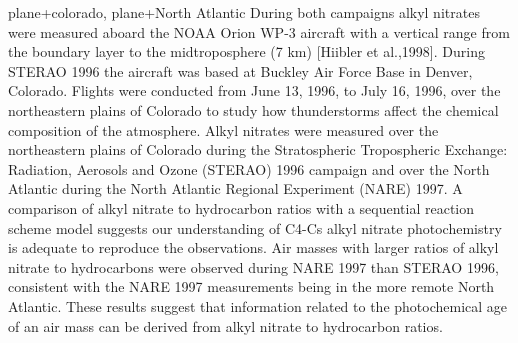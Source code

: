 \documentclass[11pt,a4paper]{article}
\begin{document}
\citep{Stroud2001} plane+colorado, plane+North Atlantic
During both campaigns alkyl nitrates were measured aboard the NOAA Orion WP-3 aircraft with a vertical range from the boundary layer to the midtroposphere (7 km) [Hiibler et al.,1998]. During STERAO 1996 the aircraft was based at Buckley Air Force Base in Denver, Colorado. Flights were conducted from June 13, 1996, to July 16, 1996, over the northeastern plains of Colorado to study how thunderstorms affect the chemical composition of the atmosphere.
Alkyl nitrates were measured over the northeastern plains of Colorado during the Stratospheric Tropospheric Exchange: Radiation, Aerosols and Ozone (STERAO) 1996 campaign and over the North Atlantic during the North Atlantic Regional Experiment (NARE) 1997. A comparison of alkyl nitrate to hydrocarbon ratios with a sequential reaction scheme model suggests our understanding of C4-Cs alkyl nitrate photochemistry is adequate to reproduce the observations. Air masses with larger ratios of alkyl nitrate to hydrocarbons were observed during NARE 1997 than STERAO 1996, consistent with the NARE 1997 measurements being in the more remote North Atlantic. These results suggest that information related to the photochemical age of an air  mass can be derived from alkyl nitrate to hydrocarbon ratios.
\end{document}
